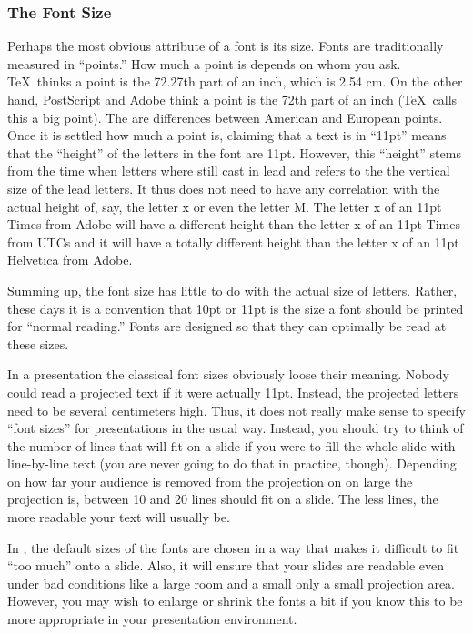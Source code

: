 \subsubsection{The Font Size}

\label{section-sizes}

Perhaps the most obvious attribute of a font is its size. Fonts are
traditionally measured in ``points.'' How much a point is depends on
whom you ask. \TeX\ thinks a point is the 72.27th part of an inch,
which is 2.54 cm. On the other hand, PostScript and Adobe think a
point is the 72th part of an inch (\TeX\ calls this a big point). The
are differences between American and European points. Once it is
settled how much a point is, claiming that a text is in ``11pt'' means
that the ``height'' of the letters in the font are 11pt. However, this
``height'' stems from the time when letters where still cast in lead
and refers to the the vertical size of the lead letters. It thus does
not need to have any correlation with the actual height of, say, the
letter x or even the letter M. The letter x of an 11pt Times from
Adobe will have a different height than the letter x of an 11pt Times
from UTCs and it will have a totally different height than the letter
x of an 11pt Helvetica from Adobe.

Summing up, the font size has little to do with the actual size of
letters. Rather, these days it is a convention that 10pt or 11pt is
the size a font should be printed for ``normal reading.'' Fonts are
designed so that they can optimally be read at these sizes.

In a presentation the classical font sizes obviously loose their
meaning. Nobody could read a projected text if it were actually
11pt. Instead, the projected letters need to be several centimeters
high. Thus, it does not really make sense to specify ``font sizes''
for presentations in the usual way. Instead, you should try to think
of the number of lines that will fit on a slide if you were to fill
the whole slide with line-by-line text (you are never going to do that
in practice, though). Depending on how far your audience is removed
from the projection on on large the projection is, between 10 and 20
lines should fit on a slide. The less lines, the more readable your
text will usually be.

In \beamer, the default sizes of the fonts are chosen in a way that
makes it difficult to fit ``too much'' onto a slide. Also, it will
ensure that your slides are readable even under bad conditions like a
large room and a small only a small projection area. However, you may
wish to enlarge or shrink the fonts a bit if you know this to be more
appropriate in your presentation environment.

